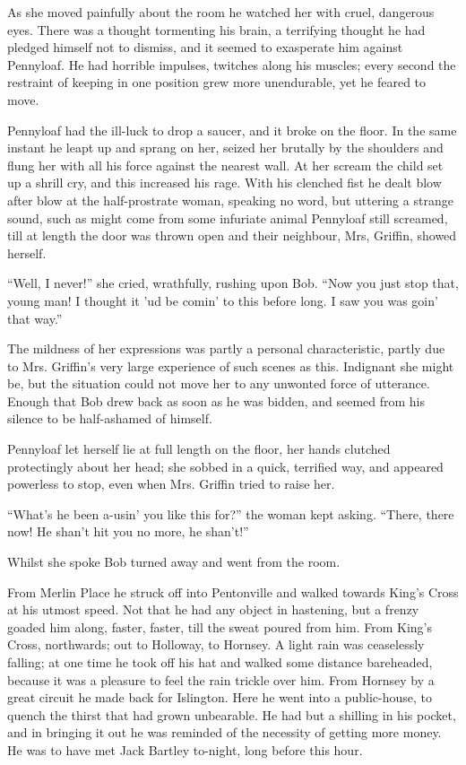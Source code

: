 As she moved painfully about the room he watched her with cruel,
dangerous eyes. There was a thought tormenting his brain, a terrifying
thought he had pledged himself not to dismiss, and it seemed to
exasperate him against Pennyloaf. He had horrible impulses, twitches
along his muscles; every second the restraint of keeping in one position
grew more unendurable, yet he feared to move.

Pennyloaf had the ill-luck to drop a saucer, and it broke on the floor.
In the same instant he leapt up and sprang on her, seized her brutally
by the shoulders and flung her with all his force against the nearest
wall. At her {}scream the child set up a shrill cry, and this increased
his rage. With his clenched fist he dealt blow after blow at the
half-prostrate woman, speaking no word, but uttering a strange sound,
such as might come from some infuriate animal Pennyloaf still screamed,
till at length the door was thrown open and their neighbour, Mrs,
Griffin, showed herself.

``Well, I never!'' she cried, wrathfully, rushing upon Bob. ``Now you
just stop that, young man! I thought it 'ud be comin' to this before
long. I saw you was goin' that way.''

The mildness of her expressions was partly a personal characteristic,
partly due to Mrs. Griffin's very large experience of such scenes as
this. Indignant she might be, but the situation could not move her to
any unwonted force of utterance. Enough that Bob drew back as soon as he
was bidden, and seemed from his silence to be half-ashamed of himself.

Pennyloaf let herself lie at full length on the floor, her hands
clutched protectingly about her head; she sobbed in a quick, terrified
way, and appeared powerless to stop, even when Mrs. Griffin tried to
raise her.

``What's he been a-usin' you like this for?'' {}the woman kept asking.
``There, there now! He shan't hit you no more, he shan't!''

Whilst she spoke Bob turned away and went from the room.

From Merlin Place he struck off into Pentonville and walked towards
King's Cross at his utmost speed. Not that he had any object in
hastening, but a frenzy goaded him along, faster, faster, till the sweat
poured from him. From King's Cross, northwards; out to Holloway, to
Hornsey. A light rain was ceaselessly falling; at one time he took off
his hat and walked some distance bareheaded, because it was a pleasure
to feel the rain trickle over him. From Hornsey by a great circuit he
made back for Islington. Here he went into a public-house, to quench the
thirst that had grown unbearable. He had but a shilling in his pocket,
and in bringing it out he was reminded of the necessity of getting more
money. He was to have met Jack Bartley to-night, long before this hour.

